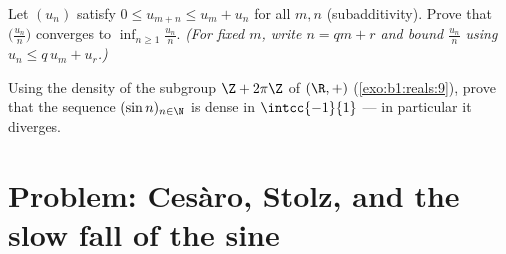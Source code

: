 \begin{exercise}[$\star\star\star$]\label{exo:b1:seq:11}
Let $(u_n)$ satisfy $0 \leq u_{m+n} \leq u_m + u_n$ for all $m, n$
(subadditivity). Prove that $\bigl(\frac{u_n}{n}\bigr)$ converges to
$\inf_{n \geq 1} \frac{u_n}{n}$. \emph{(For fixed $m$, write $n = qm
+ r$ and bound $\frac{u_n}{n}$ using $u_n \leq q\,u_m + u_r$.)}
\end{exercise}

\begin{exercise}[$\star\star\star$]\label{exo:b1:seq:12}
Using the density of the subgroup $\Z + 2\pi\Z$ of $(\R, +)$
(\cref{exo:b1:reals:9}), prove that the sequence $(\sin n)_{n \in
\N}$ is dense in $\intcc{-1}{1}$ --- in particular it diverges.
\end{exercise}

\section{Problem: Ces\`aro, Stolz, and the slow fall of the sine}

